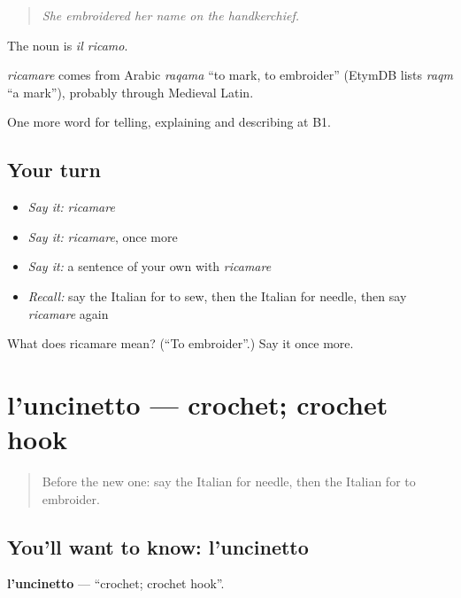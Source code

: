 \begin{quote}
\emph{She embroidered her name on the handkerchief.}
\end{quote}

The noun is \emph{il ricamo}.

\begin{cousinweb}
\emph{ricamare} comes from Arabic \emph{raqama} \textquotedblleft{}to mark, to embroider\textquotedblright{} (EtymDB lists \emph{raqm} \textquotedblleft{}a mark\textquotedblright{}), probably through Medieval Latin.
\end{cousinweb}

\begin{grammarlens}[title={What you've built}]
One more word for telling, explaining and describing at B1.
\end{grammarlens}

\subsection*{Your turn}
\begin{itemize}
\raggedright
  \item \emph{Say it:} \emph{ricamare}
  \item \emph{Say it:} \emph{ricamare}, once more
  \item \emph{Say it:} a sentence of your own with \emph{ricamare}
  \item \emph{Recall:} say the Italian for to sew, then the Italian for needle, then say \emph{ricamare} again
\end{itemize}

\begin{tcolorbox}[breakable,colback=teal!4,colframe=teal!35!black,title={Before you move on}]
What does ricamare mean? (\textquotedblleft{}To embroider\textquotedblright{}.) Say it once more.
\end{tcolorbox}
\section[l'uncinetto]{l'uncinetto — crochet; crochet hook}

\label{lesson:IT-C500-uncinetto}



\begin{quote}
Before the new one: say the Italian for needle, then the Italian for to embroider.
\end{quote}

\subsection*{You'll want to know: l'uncinetto}
\textbf{l'uncinetto} — \textquotedblleft{}crochet; crochet hook\textquotedblright{}.

